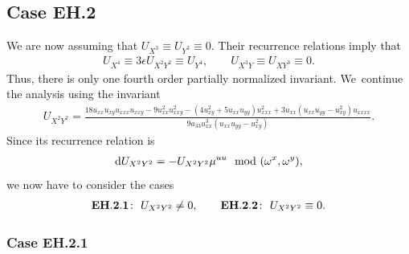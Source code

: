 \documentclass[pdftex]{sigma}%
\numberwithin{equation}{section}
\begin{document}
\subsection{Case EH.2}

We are now assuming that $U_{X^3} \equiv U_{Y^3}\equiv 0$. Their recurrence relations imply that
%
\begin{gather}\label{eq:EH.2 constraints}
U_{X^4} \equiv 3\epsilon U_{X^2Y^2}\equiv U_{Y^4},\qquad U_{X^3Y}\equiv U_{XY^3}\equiv 0.
\end{gather}
%
Thus, there is only one fourth order partially normalized invariant. We~continue the analysis using the invariant
%
\begin{gather*}
U_{X^2Y^2} = \frac{18u_{xx}u_{xy}u_{xxx}u_{xxy}\!-\!9u_{xx}^2u_{xxy}^2\!-\!(4u_{xy}^2 \!+\!5u_{xx}u_{yy})u_{xxx}^2\!+\!3u_{xx}(u_{xx}u_{yy}\!-\!u_{xy}^2)u_{xxxx}}{9 a_{33} u_{xx}^3(u_{xx}u_{yy}-u_{xy}^2)}.
\end{gather*}
%
Since its recurrence relation is
\begin{gather*}
{\rm d}U_{X^2Y^2} = - U_{X^2Y^2}\mu^{uu} \mod(\omega^x,\omega^y),
\end{gather*}
we now have to consider the cases
\begin{gather*}
{\bf EH.2.1}\colon\ U_{X^2Y^2}\neq 0,\qquad
{\bf EH.2.2}\colon\ U_{X^2Y^2}\equiv 0.
\end{gather*}

\subsubsection{Case EH.2.1}
\end{document}
